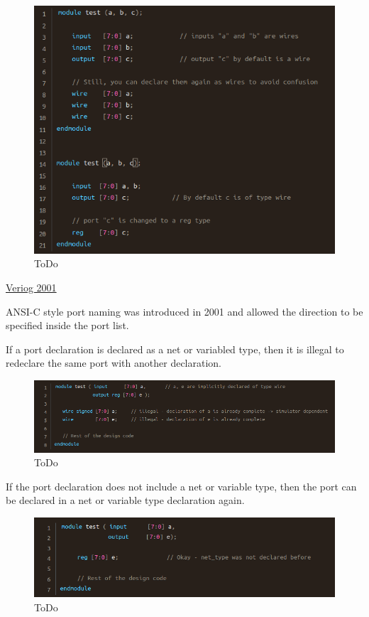 \documentclass{article}
\begin{document}
	\begin{figure}[H]
		\includegraphics[width=\linewidth]{VerilogPics/figure_29.png}
		\caption{ToDo}
		\label{ToDo}
	\end{figure}

	\underline{Veriog 2001} \newline

	ANSI-C style port naming was introduced in 2001 and allowed the direction to be specified inside the port list.

	If a port declaration is declared as a net or variabled type, then it is illegal to redeclare the same port with another declaration.

	\begin{figure}[H]
		\includegraphics[width=\linewidth]{VerilogPics/figure_30.png}
		\caption{ToDo}
		\label{ToDo}
	\end{figure}

	If the port declaration does not include a net or variable type, then the port can be declared in a net or variable type declaration again.
	\begin{figure}[H]
		\includegraphics[width=\linewidth]{VerilogPics/figure_31.png}
		\caption{ToDo}
		\label{ToDo}
	\end{figure}
\end{document}
